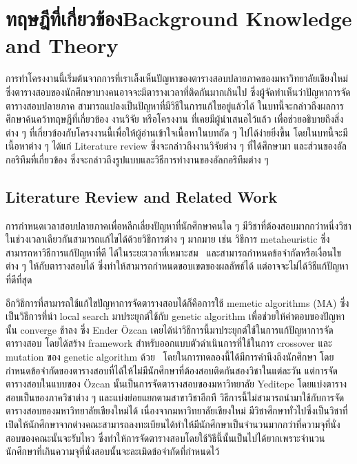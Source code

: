 \chapter{\ifcpe ทฤษฎีที่เกี่ยวข้อง\else Background Knowledge and Theory\fi}

การทำโครงงานนี้เริ่มต้นจากการที่เราเล็งเห็นปัญหาของตารางสอบปลายภาคของมหาวิทยาลัยเชียงใหม่ 
ซึ่งตารางสอบของนักศึกษาบางคนอาจจะมีตารางเวลาที่ติดกันมากเกินไป ซึ่งผู้จัดทำเห็นว่าปัญหาการจัดตารางสอบปลายภาค
สามารถแปลงเป็นปัญหาที่มีวิธีในการแก้ไขอยู่แล้วได้ ในบทนี้จะกล่าวถึงผลการศึกษาค้นคว้าทฤษฎีที่เกี่ยวข้อง งานวิจัย หรือโครงงาน ที่เคยมีผู้นำเสนอไว้แล้ว
เพื่อช่วยอธิบายถึงสิ่งต่าง ๆ ที่เกี่ยวข้องกับโครงงานนี้เพื่อให้ผู้อ่านเข้าใจเนื้อหาในบทถัด ๆ ไปได้ง่ายยิ่งขึ้น โดยในบทนี้จะมีเนื้อหาต่าง ๆ ได้แก่ Literature review 
ซึ่งจะกล่าวถึงงานวิจัยต่าง ๆ ที่ได้ศึกษามา และส่วนของอัลกอริทึมที่เกี่ยวข้อง ซึ่งจะกล่าวถึงรูปแบบและวิธีการทำงานของอัลกอริทึมต่าง ๆ 
\section{Literature Review and Related Work}
การกำหนดเวลาสอบปลายภาคเพื่อหลีกเลี่ยงปัญหาที่นักศึกษาคนใด ๆ มีวิชาที่ต้องสอบมากกว่าหนึ่งวิชาในช่วงเวลาเดียวกันสามารถแก้ไขได้ด้วยวิธีการต่าง ๆ มากมาย
เช่น วิธีการ metaheuristic ซึ่งสามารถหาวิธีการแก้ปัญหาที่ดี ได้ในระยะเวลาที่เหมาะสม~\cite{meta-for-vertexcolor}
และสามารถกำหนดข้อจำกัดหรือเงื่อนไขต่าง ๆ ให้กับตารางสอบได้ ซึ่งทำให้สามารถกำหนดขอบเขตของผลลัพธ์ได้ แต่อาจจะไม่ได้วิธีแก้ปัญหาที่ดีที่สุด

อีกวิธีการที่สามารถใช้แก้ไขปัญหาการจัดตารางสอบได้ก็คือการใช้ memetic algorithms (MA) ซึ่งเป็นวิธีการที่นำ local search มาประยุกต์ใช้กับ genetic algorithm 
เพื่อช่วยให้คำตอบของปัญหานั้น converge ช้าลง \cite{pablo-memetic-algo} ซึ่ง Ender {\"O}zcan เคยได้นำวิธีการนี้มาประยุกต์ใช้ในการแก้ปัญหาการจัดตารางสอบ 
โดยได้สร้าง framework สำหรับออกแบบตัวดำเนินการที่ใช้ในการ crossover และ mutation ของ genetic algorithm ด้วย~\cite{fes}
โดยในการทดลองนี้ได้มีการคำนึงถึงนักศึกษา โดยกำหนดข้อจำกัดของตารางสอบที่ได้ให้ไม่มีนักศึกษาที่ต้องสอบติดกันสองวิชาในแต่ละวัน แต่การจัดตารางสอบในแบบของ {\"O}zcan 
นั้นเป็นการจัดตารางสอบของมหาวิทยาลัย Yeditepe โดยแบ่งตารางสอบเป็นของภาควิชาต่าง ๆ และแบ่งย่อยแยกตามสาขาวิชาอีกที วิธีการนี้ไม่สามารถนำมาใช้กับการจัดตารางสอบของมหาวิทยาลัยเชียงใหม่ได้
เนื่องจากมหาวิทยาลัยเชียงใหม่ มีวิชาศึกษาทั่วไปซึ่งเป็นวิชาที่เปิดให้นักศึกษาจากต่างคณะสามารถลงทะเบียนได้ทำให้มีนักศึกษาเป็นจำนวนมากกว่าที่ความจุที่นั่งสอบของคณะนั้นจะรับไหว
ซึ่งทำให้การจัดตารางสอบโดยใช้วิธีนี้นั้นเป็นไปได้ยากเพราะจำนวนนักศึกษาที่เกินความจุที่นั่งสอบนั้นจะละเมิดข้อจำกัดที่กำหนดไว้ 

